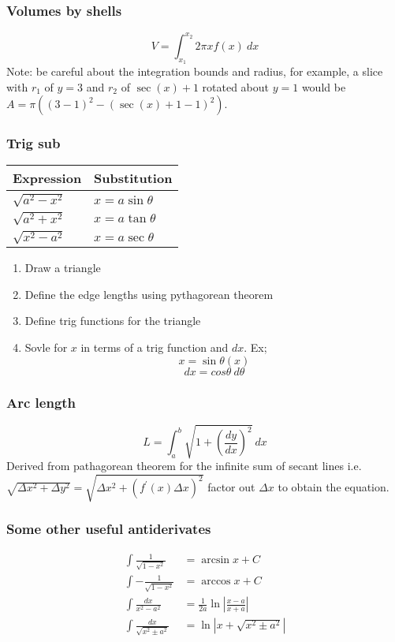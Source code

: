 \documentclass{article}
\begin{document}
\begin{multicols}{2}
\subsubsection*{Volumes by shells}
\[
	V = \int_{x_1}^{x_2} 2\pi x f(x)\ dx
\]
Note: be careful about the integration bounds and radius, for example,  a slice with $r_1$ of $y=3$ and $r_2$ of $\sec(x) + 1$ rotated about $y=1$ would be\\ $A = \pi \left( (3-1)^2 - (\sec(x) + 1 - 1)^2 \right)$.

\subsubsection*{Trig sub}
\begin{minipage}{0.2\textwidth}
    \begin{tabular}{|l|l|}
        \hline
        Expression & Substitution\\
        \hline
        $\sqrt{a^2-x^2}$ & $x=a\sin\theta$\\
        $\sqrt{a^2+x^2}$ & $x=a\tan\theta$\\
        $\sqrt{x^2-a^2}$ & $x=a\sec\theta$\\
        \hline
    \end{tabular}
\end{minipage}
\begin{minipage}{0.3\textwidth}
    \begin{enumerate}
	\item Draw a triangle
	\item Define the edge lengths using pythagorean theorem
	\item Define trig functions for the triangle
	\item Sovle for $x$ in terms of a trig function and $dx$. Ex;
		\[
			x = \sin \theta (x)
		\]
		\[
			dx = cos \theta\ d \theta
		\]
    \end{enumerate}
\end{minipage}

\subsubsection*{Arc length}
\[
	L = \int_a^b \sqrt{1 + \left(\frac{dy}{dx}\right)^2}\ dx
\]
Derived from pathagorean theorem for the infinite sum of secant lines i.e. $\sqrt{\Delta x^2 + \Delta y^2} = \sqrt{\Delta x^2 + (f^\prime(x)\Delta x)^2}$ factor out $\Delta x$ to obtain the equation.

\subsubsection*{Some other useful antiderivates}
\begin{align*}
	\int \frac{1}{\sqrt{1-x^2}} &= \arcsin x + C \\
	\int -\frac{1}{\sqrt{1-x^2}} &= \arccos x + C \\
	\int \frac{dx}{x^2-a^2} &= \frac{1}{2a} \ln \left| \frac{x-a}{x+a} \right| \\
	\int \frac{dx}{\sqrt{x^2 \pm a^2}} &= \ln \left| x + \sqrt{x^2 \pm a^2} \right|
\end{align*}


\end{multicols}
\end{document}
